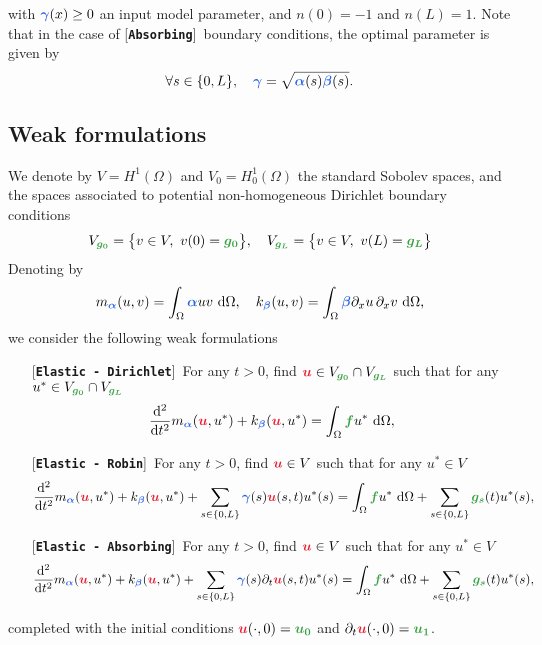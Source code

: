 \documentclass[11pt,a4paper]{article}
\newcommand{\unknown}[1]{\bm{{\color{myred}{#1}}}}
\newcommand{\param}[1]{\bm{{\color{myhyperblue}{#1}}}}
\newcommand{\data}[1]{\bm{{\color{mygreen}{#1}}}}
\newcommand{\keyword}[1]{[\texttt{\textbf{#1}}]\!\,}
\begin{document}
with $\param{\gamma}(x) \geq 0$ an input model parameter, and $n(0) = -1$ and $n(L) = 1$. Note that in the case of \keyword{Absorbing} boundary conditions, the optimal parameter is given by
\begin{equation*}
\forall s \in\{0, L\},\quad \param{\gamma} = \sqrt{\param{\alpha}(s)\param{\beta}(s)}.
\end{equation*}

\subsection{Weak formulations}
We denote by $V = H^1(\Omega)$ and $V_0 = H^1_0(\Omega)$ the standard Sobolev spaces, and the spaces associated to potential non-homogeneous Dirichlet boundary conditions
\begin{equation*}
V_{\data{g_0}} = \big\{v \in V,~v(0) = \data{g_0}\big\},\quad V_{\data{g_L}} = \big\{v \in V,~v(L) = \data{g_L}\big\}
\end{equation*}
Denoting by
\begin{equation*}
m_{\param{\alpha}}(u, v) = \int_\Omega \param{\alpha} u v~\mathrm{d}\Omega, \quad k_{\param{\beta}}(u, v) = \int_\Omega \param{\beta} \partial_xu \,\partial_x v~\mathrm{d}\Omega,
\end{equation*}
we consider the following weak formulations
\begin{itemize}
\item[] \keyword{Elastic - Dirichlet} For any $t > 0$, find $\unknown{u}\in V_{\data{g_0}} \cap V_{\data{g_L}}$ such that for any $u^* \in V_{\data{g_0}} \cap V_{\data{g_L}}$
\begin{equation*}
\dfrac{\mathrm{d}^2}{\mathrm{d}t^2} m_{\param{\alpha}}(\unknown{u}, u^*) +
k_{\param{\beta}} (\unknown{u}, u^*) = \int_\Omega \data{f}u^*~\mathrm{d}\Omega, 
\end{equation*}
\item[] \keyword{Elastic - Robin} For any $t > 0$, find $\unknown{u}\in V$ such that for any $u^* \in V$
\begin{equation*}
\dfrac{\mathrm{d}^2}{\mathrm{d}t^2} m_{\param{\alpha}}(\unknown{u}, u^*) +
k_{\param{\beta}} (\unknown{u}, u^*)  + \sum_{s\in\{0, L\}}\param{\gamma}(s)\unknown{u}(s, t)u^*(s) = \int_\Omega \data{f}u^*~\mathrm{d}\Omega + \sum_{s\in\{0, L\}}\data{g_s}(t)u^*(s), 
\end{equation*}
\item[] \keyword{Elastic - Absorbing} For any $t > 0$, find $\unknown{u}\in V$ such that for any $u^* \in V$
\begin{equation*}
\dfrac{\mathrm{d}^2}{\mathrm{d}t^2} m_{\param{\alpha}}(\unknown{u}, u^*) +
k_{\param{\beta}} (\unknown{u}, u^*)  + \sum_{s\in\{0, L\}}\param{\gamma}(s)\partial_t\unknown{u}(s, t)u^*(s) = \int_\Omega \data{f}u^*~\mathrm{d}\Omega + \sum_{s\in\{0, L\}}\data{g_s}(t)u^*(s), 
\end{equation*}
\end{itemize}
completed with the initial conditions $\unknown{u}(\cdot, 0) = \data{u_0}$ and $\partial_t\unknown{u}(\cdot, 0) = \data{u_1}$. 
\end{document}

